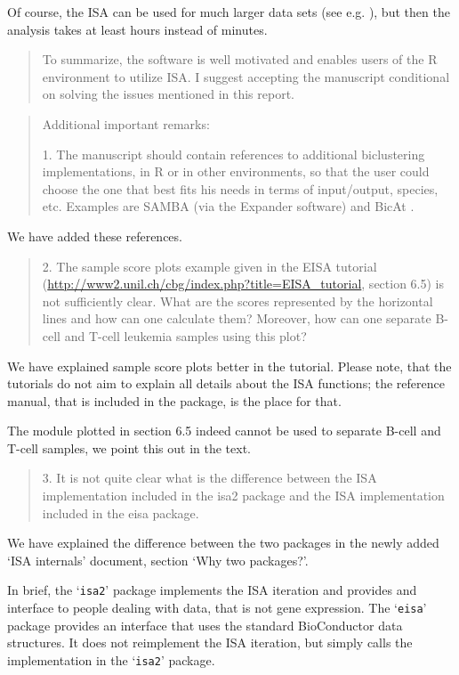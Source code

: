 \documentclass[a4paper]{article}
\newcommand{\Rpackage}[1]{`\texttt{#1}'}
\newenvironment{myquote}{\begin{quote}\color{blue}}{\end{quote}}
\begin{document}
Of course, the ISA can be used for much larger data sets (see
e.g. \cite{bergmann04}), but then the analysis takes at least hours
instead of minutes.

\begin{myquote}
To summarize, the software is well motivated and enables users of the
R environment to utilize ISA. I suggest accepting the manuscript
conditional on solving the issues mentioned in this report. 
\end{myquote}

\begin{myquote}
Additional important remarks:

1.      The manuscript should contain references to additional
biclustering implementations, in R or in other environments, so that
the user could choose the one that best fits his needs in terms of
input/output, species, etc. Examples are SAMBA (via the Expander
software) \citep{sharan02,tanay04} and BicAt \citep{barkow06}. 
\end{myquote}

We have added these references.

\begin{myquote}
2.      The sample score plots example given in the EISA tutorial
(\url{http://www2.unil.ch/cbg/index.php?title=EISA\_tutorial}, section 6.5)
is not sufficiently clear. What are the scores represented by the
horizontal lines and how can one calculate them? Moreover, how can one
separate B-cell and T-cell leukemia samples using this plot? 
\end{myquote}

We have explained sample score plots better in the tutorial. 
Please note, that the tutorials do not aim to explain all details 
about the ISA functions; the reference manual, that is included in the
package, is the place for that.

The module plotted in section 6.5 indeed cannot be used to separate
B-cell and T-cell samples, we point this out in the text.

\begin{myquote}
3.      It is not quite clear what is the difference between the ISA
implementation included in the isa2 package and the ISA implementation
included in the eisa package. 
\end{myquote}

We have explained the difference between the two packages in the newly
added `ISA internals' document, section `Why two packages?'. 

In brief, the \Rpackage{isa2} package implements the ISA iteration and
provides and interface to people dealing with data, that is not gene
expression. The \Rpackage{eisa} package provides an interface that
uses the standard BioConductor data structures. It does not
reimplement the ISA iteration, but simply calls the implementation in
the \Rpackage{isa2} package.
\end{document}
